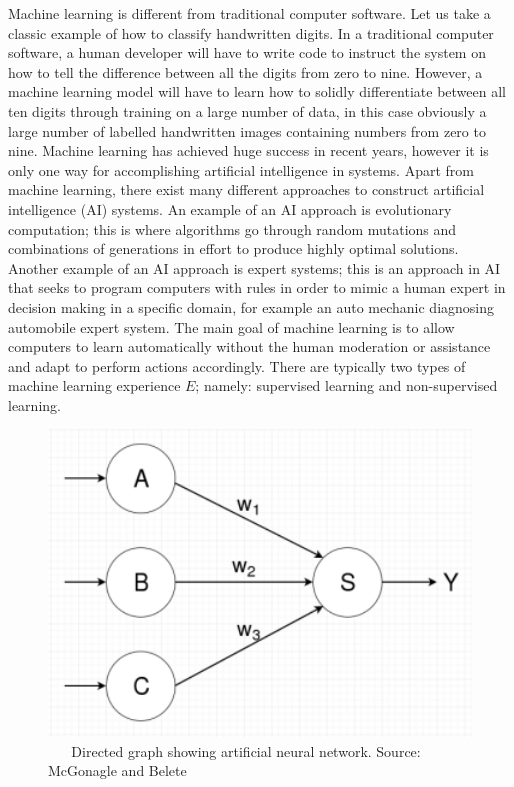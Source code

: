 \documentclass[master]{thesis-uestc}
\begin{document}
Machine learning is different from traditional computer software. Let us take a classic example of how to classify handwritten digits. In a traditional computer software, a human developer will have to write code to instruct the system on how to tell the difference between all the digits from zero to nine. However, a machine learning model will have to learn how to solidly differentiate between all ten digits through training on a large number of data, in this case obviously a large number of labelled handwritten images containing numbers from zero to nine. Machine learning has achieved huge success in recent years, however it is only one way for accomplishing artificial intelligence in systems. Apart from machine learning, there exist many different approaches to construct artificial intelligence (AI) systems. An example of an AI approach is evolutionary computation; this is where algorithms go through random mutations and combinations of generations in effort to produce highly optimal solutions. Another example of an AI approach is expert systems; this is an approach in AI that seeks to program computers with rules in order to mimic a human expert in decision making in a specific domain, for example an auto mechanic diagnosing automobile expert system. The main goal of machine learning is to allow computers to learn automatically without the human moderation or assistance and adapt to perform actions accordingly. There are typically two types of machine learning experience $E$; namely: supervised learning and non-supervised learning.

\begin{figure}[ht]
\includegraphics[width=5in]{pic/neuron.png}
\caption{\,\,\,\,\,\,\,\,\,\,Directed graph showing artificial neural network. Source: McGonagle and Belete\cite{McGonagle}}
\label{fig_neuron}
\end{figure}
\end{document}
